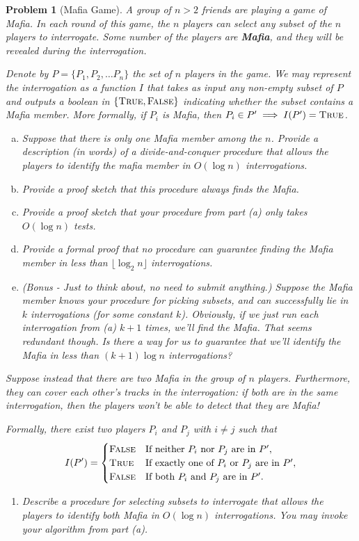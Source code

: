 \documentclass[10pt]{article}
\newtheorem{problem}{\sc\color{cit}Problem}
\begin{document}
\newpage
\begin{problem}[Mafia Game]
A group of $n > 2$ friends are playing a game of Mafia. In each round of this game, the $n$ players can select any subset of the $n$ players to interrogate. Some number of the players are \textbf{Mafia}, and they will be revealed during the interrogation.

Denote by $P = \{P_1, P_2, \ldots P_n\}$ the set of $n$ players in the game. We may represent the interrogation as a function $I$ that takes as input any non-empty subset of $P$ and outputs a boolean in $\{\textsc{True}, \textsc{False}\}$ indicating whether the subset contains a Mafia member. More formally, if $P_i$ is Mafia, then $P_i \in P' \implies I(P') = \textsc{True}$.  
\begin{enumerate}[(a)]
    \item Suppose that there is only one Mafia member among the $n$. Provide a description (in words) of a divide-and-conquer procedure that allows the players to identify the mafia member in $O(\log n)$ interrogations. 
    \item Provide a proof sketch that this procedure always finds the Mafia. 
    \item Provide a proof sketch that your procedure from part (a) only takes $O(\log n)$ tests.
    \item Provide a formal proof that no procedure can guarantee finding the Mafia member in less than $\lfloor \log_2 n \rfloor$ interrogations. 
    \item (Bonus - Just to think about, no need to submit anything.) Suppose the Mafia member knows your procedure for picking subsets, and can successfully lie in $k$ interrogations (for some constant $k$). Obviously, if we just run each interrogation from (a) $k+1$ times, we'll find the Mafia. That seems redundant though. Is there a way for us to guarantee that we'll identify the Mafia in less than $(k+1)\log n$ interrogations? 
\end{enumerate}
Suppose instead that there are two Mafia in the group of $n$ players. Furthermore, they can cover each other's tracks in the interrogation: if both are in the same interrogation, then the players won't be able to detect that they are Mafia!

Formally, there exist two players $P_i$ and $P_j$ with $i \neq j$ such that
    \[
    I(P') = 
    \begin{cases}
        \textsc{False} & \text{If neither $P_i$ nor $P_j$ are in $P'$}, \\
        \textsc{True} & \text{If exactly one of $P_i$ or $P_j$ are in $P'$}, \\
        \textsc{False} & \text{If both $P_i$ and $P_j$ are in $P'$}. \\
    \end{cases}
    \]
\begin{enumerate}
    \item[(f)] Describe a procedure for selecting subsets to interrogate that allows the players to identify both Mafia in $O(\log n)$ interrogations. You may invoke your algorithm from part (a).
 

\end{enumerate}
\end{problem}
\end{document}
